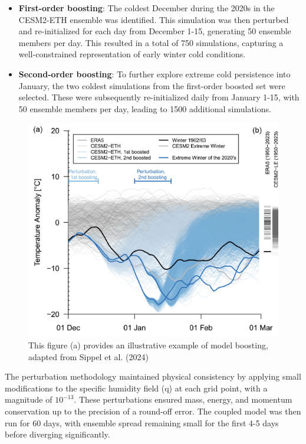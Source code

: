 \documentclass[
]{krantz}
\providecommand{\tightlist}{%
  \setlength{\itemsep}{0pt}\setlength{\parskip}{0pt}}
\begin{document}
\begin{itemize}
\tightlist
\item
  \textbf{First-order boosting}: The coldest December during the 2020s in the CESM2-ETH ensemble was identified. This simulation was then perturbed and re-initialized for each day from December 1-15, generating 50 ensemble members per day. This resulted in a total of 750 simulations, capturing a well-constrained representation of early winter cold conditions.
\item
  \textbf{Second-order boosting}: To further explore extreme cold persistence into January, the two coldest simulations from the first-order boosted set were selected. These were subsequently re-initialized daily from January 1-15, with 50 ensemble members per day, leading to 1500 additional simulations.
\end{itemize}

\begin{figure}

{\centering \includegraphics[width=0.7\linewidth]{work/03-coldex/figures/boosting_original} 

}

\caption{This figure (a) provides an illustrative example of model boosting, adapted from Sippel et al. (2024)}\label{fig:boosting-example}
\end{figure}

The perturbation methodology maintained physical consistency by applying small modifications to the specific humidity field (q) at each grid point, with a magnitude of \(10^{-13}\). These perturbations ensured mass, energy, and momentum conservation up to the precision of a round-off error. The coupled model was then run for 60 days, with ensemble spread remaining small for the first 4-5 days before diverging significantly.
\end{document}
